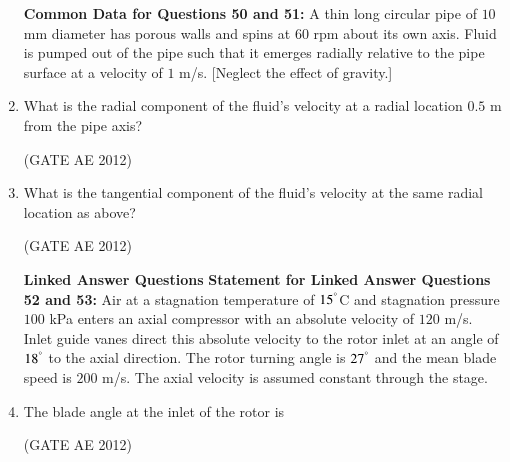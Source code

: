 \documentclass[journal,12pt,onecolumn]{IEEEtran}
\theoremstyle{remark}
\begin{document}
\begin{enumerate}
\textbf{Common Data for Questions 50 and 51:}
A thin long circular pipe of $10$ mm diameter has porous walls and spins at $60$ rpm about its own axis. Fluid is pumped out of the pipe such that it emerges radially relative to the pipe surface at a velocity of $1$ m/s. [Neglect the effect of gravity.]

\item What is the radial component of the fluid's velocity at a radial location $0.5$ m from the pipe axis?
\begin{enumerate}
\end{enumerate}
\hfill(GATE AE 2012)



\item What is the tangential component of the fluid's velocity at the same radial location as above?
\begin{enumerate}
\end{enumerate}
\hfill(GATE AE 2012)



\textbf{Linked Answer Questions}
\textbf{Statement for Linked Answer Questions 52 and 53:}
Air at a stagnation temperature of $15^\degree$C and stagnation pressure $100$ kPa enters an axial compressor with an absolute velocity of $120$ m/s. Inlet guide vanes direct this absolute velocity to the rotor inlet at an angle of $18^\degree$ to the axial direction. The rotor turning angle is $27^\degree$ and the mean blade speed is $200$ m/s. The axial velocity is assumed constant through the stage.

\item The blade angle at the inlet of the rotor is
\begin{enumerate}
\end{enumerate}
\hfill(GATE AE 2012)




\end{enumerate}
\end{document}
